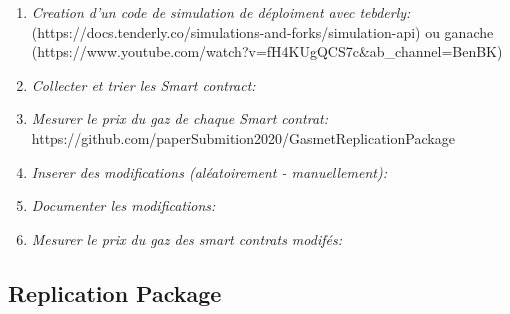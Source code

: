 \begin{enumerate}
  \item \emph{Creation d'un code de simulation de déploiment avec tebderly:}(https://docs.tenderly.co/simulations-and-forks/simulation-api) ou ganache (https://www.youtube.com/watch?v=fH4KUgQCS7c&ab_channel=BenBK)
  
  
  \item \emph{Collecter et trier les Smart contract:}
  
  \item \emph{Mesurer le prix du gaz de chaque Smart contrat:}
  https://github.com/paperSubmition2020/GasmetReplicationPackage

  
  \item \emph{Inserer des modifications (aléatoirement - manuellement):}
  
  \item \emph{Documenter les modifications:}


  \item \emph{Mesurer le prix du gaz des smart contrats modifés:} 
  
\end{enumerate}




\subsection{Replication Package}
\label{sec:Replication Package}
